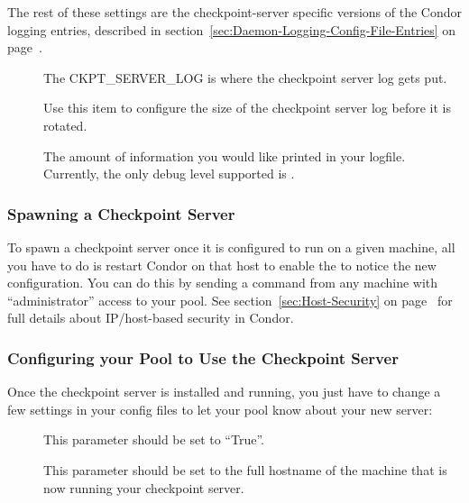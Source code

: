 The rest of these settings are the checkpoint-server specific versions
of the Condor logging entries, described in
section~\ref{sec:Daemon-Logging-Config-File-Entries} on
page~\pageref{sec:Daemon-Logging-Config-File-Entries}.
\begin{description}

\item[] The CKPT\_SERVER\_LOG is where the
checkpoint server log gets put.

\item[] Use this item to configure the
size of the checkpoint server log before it is rotated.

\item[] The amount of information you would
like printed in your logfile.
Currently, the only debug level supported is .

\end{description}

\subsubsection{\label{sec:Spawn-Ckpt-Server} 
Spawning a Checkpoint Server} 

To spawn a checkpoint server once it is configured to run on a given
machine, all you have to do is restart Condor on that host to enable
the  to notice the new configuration.
You can do this by sending a  command from any machine
with ``administrator'' access to your pool.
See section~\ref{sec:Host-Security} on
page~\pageref{sec:Host-Security} for full details about IP/host-based
security in Condor.

\subsubsection{\label{sec:Configure-Pool-Ckpt-Server} 
Configuring your Pool to Use the Checkpoint Server}

Once the checkpoint server is installed and running, you just have to
change a few settings in your config files to let your pool know
about your new server:
\begin{description}

\item[] This parameter should be set to
``True''.

\item[] This parameter should be set to
the full hostname of the machine that is now running your checkpoint
server.  

\end{description}

